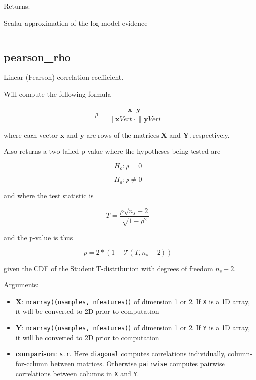 Returns:

Scalar approximation of the log model evidence

\begin{center}\rule{0.5\linewidth}{\linethickness}\end{center}

\subsection{pearson\_rho}\label{pearson_rho}

\begin{Shaded}
\begin{Highlighting}[]
\OperatorTok{=}\NormalTok{)}
\end{Highlighting}
\end{Shaded}

Linear (Pearson) correlation coefficient.

Will compute the following formula

\[
\rho = \frac{\mathbf x^\top \mathbf y}{\lVert \mathbf x 
Vert \cdot \lVert \mathbf y 
Vert}
\]

where each vector \(\mathbf x\) and \(\mathbf y\) are rows of the
matrices \(\mathbf X\) and \(\mathbf Y\), respectively.

Also returns a two-tailed p-value where the hypotheses being tested are

\[
H_o: \rho = 0
\]

\[
H_a: \rho \neq 0
\]

and where the test statistic is

\[
T = \frac{\rho \sqrt{n_s-2}}{\sqrt{1 - \rho^2}}
\]

and the p-value is thus

\[
p = 2*(1 - \mathcal T(T, n_s-2))
\]

given the CDF of the Student T-distribution with degrees of freedom
\(n_s-2\).

Arguments:

\begin{itemize}
\tightlist
\item
  \textbf{X}: \texttt{ndarray((nsamples,\ nfeatures))} of dimension 1 or
  2. If \texttt{X} is a 1D array, it will be converted to 2D prior to
  computation
\item
  \textbf{Y}: \texttt{ndarray((nsamples,\ nfeatures))} of dimension 1 or
  2. If \texttt{Y} is a 1D array, it will be converted to 2D prior to
  computation
\item
  \textbf{comparison}: \texttt{str}. Here
  \texttt{\textquotesingle{}diagonal\textquotesingle{}} computes
  correlations individually, column-for-column between matrices.
  Otherwise \texttt{\textquotesingle{}pairwise\textquotesingle{}}
  computes pairwise correlations between columns in \texttt{X} and
  \texttt{Y}.
\end{itemize}

